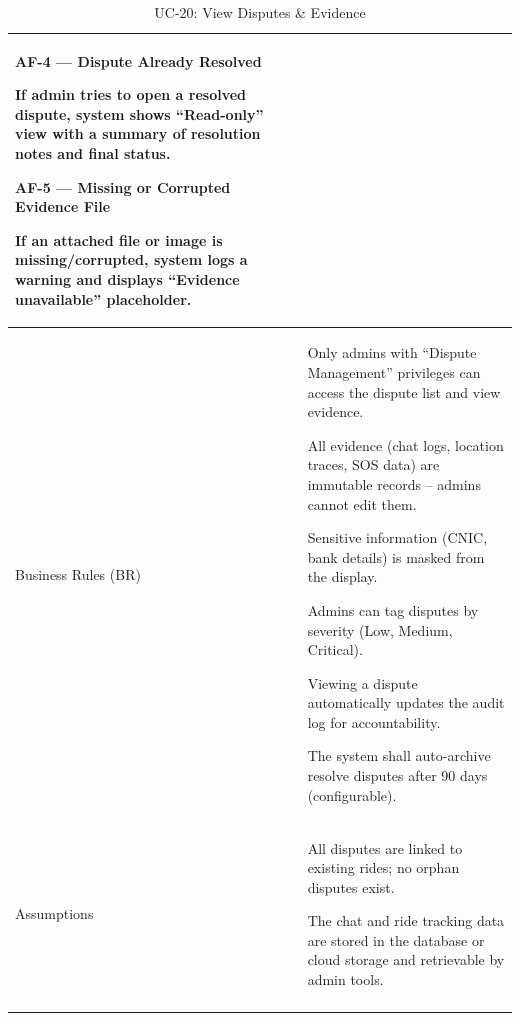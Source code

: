 \begin{longtable}{|p{3.5cm}|p{12cm}|}
\textbf{AF-4 --- Dispute Already Resolved}

If admin tries to open a resolved dispute, system shows “Read-only” view with a summary of resolution notes and final status.

\textbf{AF-5 --- Missing or Corrupted Evidence File}

If an attached file or image is missing/corrupted, system logs a warning and displays “Evidence unavailable” placeholder. \\
\hline
Business Rules (BR) &
Only admins with “Dispute Management” privileges can access the dispute list and view evidence.

All evidence (chat logs, location traces, SOS data) are immutable records – admins cannot edit them.

Sensitive information (CNIC, bank details) is masked from the display.

Admins can tag disputes by severity (Low, Medium, Critical).

Viewing a dispute automatically updates the audit log for accountability.

The system shall auto-archive resolve disputes after 90 days (configurable). \\
\hline
Assumptions &
All disputes are linked to existing rides; no orphan disputes exist.

The chat and ride tracking data are stored in the database or cloud storage and retrievable by admin tools. \\
\hline
\caption{UC-20: View Disputes \& Evidence}
\end{longtable}

